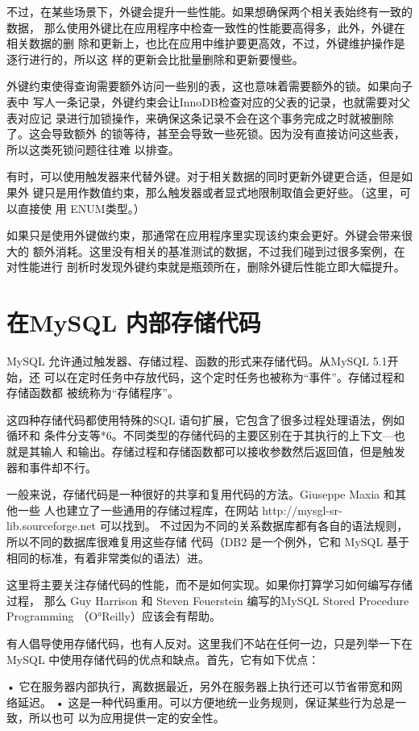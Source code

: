 不过，在某些场景下，外键会提升一些性能。如果想确保两个相关表始终有一致的数据，
那么使用外键比在应用程序中检查一致性的性能要高得多，此外，外键在相关数据的删
除和更新上，也比在应用中维护要更高效，不过，外键维护操作是逐行进行的，所以这
样的更新会比批量删除和更新要慢些。

外键约束使得查询需要额外访问一些别的表，这也意味着需要额外的锁。如果向子表中
写人一条记录，外键约束会让InnoDB检查对应的父表的记录，也就需要对父表对应记
录进行加锁操作，来确保这条记录不会在这个事务完成之时就被删除了。这会导致额外
的锁等待，甚至会导致一些死锁。因为没有直接访问这些表，所以这类死锁问题往往难
以排查。

有时，可以使用触发器来代替外键。对于相关数据的同时更新外键更合适，但是如果外
键只是用作数值约束，那么触发器或者显式地限制取值会更好些。（这里，可以直接使
用 ENUM类型。）

如果只是使用外键做约束，那通常在应用程序里实现该约束会更好。外键会带来很大的
额外消耗。这里没有相关的基准测试的数据，不过我们碰到过很多案例，在对性能进行
剖析时发现外键约束就是瓶颈所在，删除外键后性能立即大幅提升。

\section{在MySQL 内部存储代码}
MySQL 允许通过触发器、存储过程、函数的形式来存储代码。从MySQL 5.1开始，还
可以在定时任务中存放代码，这个定时任务也被称为“事件”。存储过程和存储函数都
被统称为“存储程序”。

这四种存储代码都使用特殊的SQL 语句扩展，它包含了很多过程处理语法，例如循环和
条件分支等*6。不同类型的存储代码的主要区别在于其执行的上下文—也就是其输人
和输出。存储过程和存储函数都可以接收参数然后返回值，但是触发器和事件却不行。

一般来说，存储代码是一种很好的共享和复用代码的方法。Giuseppe Maxia 和其他一些
人也建立了一些通用的存储过程库，在网站 http://mysgl-sr-lib.sourceforge.net 可以找到。
不过因为不同的关系数据库都有各自的语法规则，所以不同的数据库很难复用这些存储
代码（DB2 是一个例外，它和 MySQL 基于相同的标准，有着非常类似的语法）进。

这里将主要关注存储代码的性能，而不是如何实现。如果你打算学习如何编写存储过程，
那么 Guy Harrison 和 Steven Feuerstein 编写的MySQL Stored Procedure Programming
（O°Reilly）应该会有帮助。

有人倡导使用存储代码，也有人反对。这里我们不站在任何一边，只是列举一下在
MySQL 中使用存储代码的优点和缺点。首先，它有如下优点：

• 它在服务器内部执行，离数据最近，另外在服务器上执行还可以节省带宽和网络延迟。
• 这是一种代码重用。可以方便地统一业务规则，保证某些行为总是一致，所以也可
以为应用提供一定的安全性。

